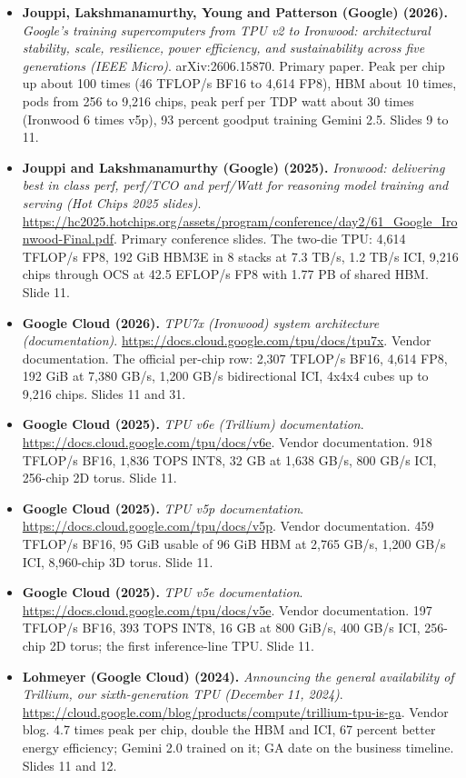 \begin{itemize}[leftmargin=1.2em,itemsep=3pt]
\item \textbf{Jouppi, Lakshmanamurthy, Young and Patterson (Google) (2026).} \textit{Google's training supercomputers from TPU v2 to Ironwood: architectural stability, scale, resilience, power efficiency, and sustainability across five generations (IEEE Micro)}. arXiv:2606.15870. Primary paper. Peak per chip up about 100 times (46 TFLOP/s BF16 to 4,614 FP8), HBM about 10 times, pods from 256 to 9,216 chips, peak perf per TDP watt about 30 times (Ironwood 6 times v5p), 93 percent goodput training Gemini 2.5. Slides 9 to 11.
\item \textbf{Jouppi and Lakshmanamurthy (Google) (2025).} \textit{Ironwood: delivering best in class perf, perf/TCO and perf/Watt for reasoning model training and serving (Hot Chips 2025 slides)}. \url{https://hc2025.hotchips.org/assets/program/conference/day2/61_Google_Ironwood-Final.pdf}. Primary conference slides. The two-die TPU: 4,614 TFLOP/s FP8, 192 GiB HBM3E in 8 stacks at 7.3 TB/s, 1.2 TB/s ICI, 9,216 chips through OCS at 42.5 EFLOP/s FP8 with 1.77 PB of shared HBM. Slide 11.
\item \textbf{Google Cloud (2026).} \textit{TPU7x (Ironwood) system architecture (documentation)}. \url{https://docs.cloud.google.com/tpu/docs/tpu7x}. Vendor documentation. The official per-chip row: 2,307 TFLOP/s BF16, 4,614 FP8, 192 GiB at 7,380 GB/s, 1,200 GB/s bidirectional ICI, 4x4x4 cubes up to 9,216 chips. Slides 11 and 31.
\item \textbf{Google Cloud (2025).} \textit{TPU v6e (Trillium) documentation}. \url{https://docs.cloud.google.com/tpu/docs/v6e}. Vendor documentation. 918 TFLOP/s BF16, 1,836 TOPS INT8, 32 GB at 1,638 GB/s, 800 GB/s ICI, 256-chip 2D torus. Slide 11.
\item \textbf{Google Cloud (2025).} \textit{TPU v5p documentation}. \url{https://docs.cloud.google.com/tpu/docs/v5p}. Vendor documentation. 459 TFLOP/s BF16, 95 GiB usable of 96 GiB HBM at 2,765 GB/s, 1,200 GB/s ICI, 8,960-chip 3D torus. Slide 11.
\item \textbf{Google Cloud (2025).} \textit{TPU v5e documentation}. \url{https://docs.cloud.google.com/tpu/docs/v5e}. Vendor documentation. 197 TFLOP/s BF16, 393 TOPS INT8, 16 GB at 800 GiB/s, 400 GB/s ICI, 256-chip 2D torus; the first inference-line TPU. Slide 11.
\item \textbf{Lohmeyer (Google Cloud) (2024).} \textit{Announcing the general availability of Trillium, our sixth-generation TPU (December 11, 2024)}. \url{https://cloud.google.com/blog/products/compute/trillium-tpu-is-ga}. Vendor blog. 4.7 times peak per chip, double the HBM and ICI, 67 percent better energy efficiency; Gemini 2.0 trained on it; GA date on the business timeline. Slides 11 and 12.

\end{itemize}
